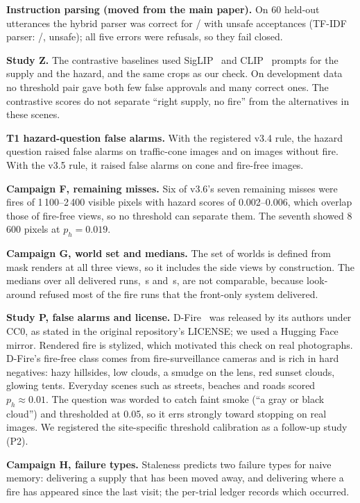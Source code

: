 \documentclass[conference]{IEEEtran}
\begin{document}
\textbf{Instruction parsing (moved from the main paper).}
On 60 held-out utterances the hybrid parser was correct for \IntCorrect{}/\IntN{} with \IntUnsafe{} unsafe acceptances
(TF-IDF parser: \IntTfidfCorrect{}/\IntN{}, \IntTfidfUnsafe{} unsafe); all five errors were refusals, so they fail closed.


\textbf{Study Z.} The contrastive baselines used SigLIP~\cite{zhai2023siglip} and CLIP~\cite{radford2021clip} prompts for the supply and the
hazard, and the same crops as our check. On development data no threshold pair gave both few false approvals and many correct ones. The
contrastive scores do not separate ``right supply, no fire'' from the alternatives in these scenes.

\textbf{T1 hazard-question false alarms.} With the registered v3.4 rule, the hazard question raised false alarms on \TConeAlarm{} traffic-cone images
and on \TNoFireAlarm{} images without fire. With the v3.5 rule, it raised false alarms on \TvConeAlarm{} cone and \TvNoFireAlarm{} fire-free images.

\textbf{Campaign F, remaining misses.} Six of v3.6's seven remaining misses were fires of 1\,100--2\,400 visible pixels with hazard
scores of 0.002--0.006, which overlap those of fire-free views, so no threshold can separate them. The seventh showed 8\,600
pixels at $p_h=0.019$.

\textbf{Campaign G, world set and medians.} The set of worlds is defined from mask renders at all three views, so it includes the side
views by construction. The medians over all delivered runs, \GWallB\,s and \GWallC\,s, are not comparable, because look-around refused
most of the fire runs that the front-only system delivered.

\textbf{Study P, false alarms and license.} D-Fire~\cite{venancio2022dfire} was released by its authors under CC0, as stated in the original
repository's LICENSE; we used a Hugging Face mirror. Rendered fire is stylized, which motivated this check on real photographs.
D-Fire's fire-free class comes from fire-surveillance cameras and is rich in hard
negatives: hazy hillsides, low clouds, a smudge on the lens, red sunset clouds, glowing tents. Everyday scenes such as streets, beaches
and roads scored $p_h\approx0.01$. The question was worded to catch faint smoke (``a gray or black cloud'') and thresholded at 0.05, so it
errs strongly toward stopping on real images. We registered the site-specific threshold calibration as a follow-up study (P2).

\textbf{Campaign H, failure types.} Staleness predicts two failure types for naive memory: delivering a supply that has been moved away,
and delivering where a fire has appeared since the last visit; the per-trial ledger records which occurred.
\end{document}
